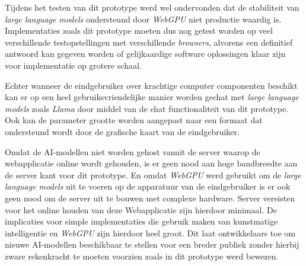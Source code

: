 \bigbreak{}

Tijdens het testen van dit prototype werd wel ondervonden dat de stabiliteit van \textit{large language models} ondersteund door \textit{WebGPU} niet productie waardig is. Implementaties zoals dit prototype moeten dus nog getest worden op veel verschillende testopstellingen met verschillende \textit{browsers}, alvorens een definitief antwoord kan gegeven worden of gelijkaardige software oplossingen klaar zijn voor implementatie op grotere schaal.

\bigbreak{}

Echter wanneer de eindgebruiker over krachtige computer componenten beschikt kan er op een heel gebruiksvriendelijke manier worden gechat met 
\textit{large language models} zoals \textit{Llama} door middel van de chat functionaliteit van dit prototype. Ook kan de parameter grootte worden aangepast naar een formaat dat ondersteund wordt door de grafische kaart van de eindgebruiker.

\bigbreak{}

Omdat de AI-modellen niet worden gehost vanuit de server waarop de webapplicatie online wordt gehouden, is er geen nood aan hoge bandbreedte aan de server kant voor dit prototype. En omdat \textit{WebGPU} werd gebruikt om de \textit{large language models} uit te voeren op de apparatuur van de eindgebruiker is er ook geen nood om de server uit te bouwen met complexe hardware. Server vereisten voor het online houden van deze Webapplicatie zijn hierdoor minimaal. De implicaties voor simple implementaties die gebruik maken van kunstmatige intelligentie en \textit{WebGPU} zijn hierdoor heel groot. Dit laat ontwikkelaars toe om nieuwe AI-modellen beschikbaar te stellen voor een breder publiek zonder hierbij zware rekenkracht te moeten voorzien zoals in dit prototype werd bewezen.